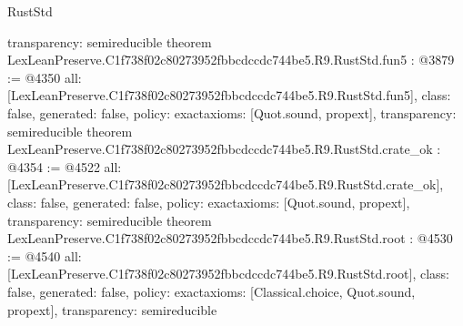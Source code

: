 \begin{lexlean}{RustStd}
\begin{coremodule}
{  transparency: semireducible
}
theorem LexLeanPreserve.C1f738f02c80273952fbbcdccdc744be5.R9.RustStd.fun5 : @3879 := @4350 {
  all: [LexLeanPreserve.C1f738f02c80273952fbbcdccdc744be5.R9.RustStd.fun5],
  class: false,
  generated: false,
  policy: exact{axioms: [Quot.sound, propext]},
  transparency: semireducible
}
theorem LexLeanPreserve.C1f738f02c80273952fbbcdccdc744be5.R9.RustStd.crate_ok : @4354 := @4522 {
  all: [LexLeanPreserve.C1f738f02c80273952fbbcdccdc744be5.R9.RustStd.crate_ok],
  class: false,
  generated: false,
  policy: exact{axioms: [Quot.sound, propext]},
  transparency: semireducible
}
theorem LexLeanPreserve.C1f738f02c80273952fbbcdccdc744be5.R9.RustStd.root : @4530 := @4540 {
  all: [LexLeanPreserve.C1f738f02c80273952fbbcdccdc744be5.R9.RustStd.root],
  class: false,
  generated: false,
  policy: exact{axioms: [Classical.choice, Quot.sound, propext]},
  transparency: semireducible
}


\end{coremodule}
\end{lexlean}
